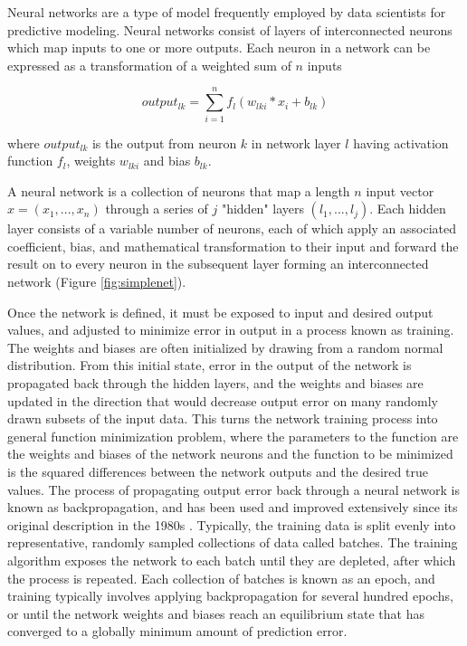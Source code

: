 Neural networks are a type of model frequently employed by data scientists
for predictive modeling. Neural networks consist of layers of interconnected neurons
which map inputs to one or more outputs. Each neuron in a network can be expressed as a 
transformation of a weighted sum of $n$ inputs 

\begin{equation}
output_{lk} = \sum_{i=1}^{n} f_l(w_{lki} * x_{i} + b_{lk})
\label{eq:neuron}
\end{equation}

where $output_{lk}$ is the output from neuron $k$ in network layer $l$ having activation
function $f_l$, weights $w_{lki}$ and bias $b_{lk}$.

A neural network is a collection of neurons that map a 
length $n$ input vector $x = (x_1, ..., x_n)$ through a series of $j$ 
"hidden" layers $(l_1, ..., l_j)$. Each hidden layer consists of a variable 
number of neurons, each of which apply an associated coefficient, bias, and 
mathematical transformation to their input and forward the 
result on to every neuron in the subsequent layer forming an interconnected 
network (Figure \ref{fig:simplenet}).

\ifdefined\showtablesandfigures
\fi

Once the network is defined, it must be exposed to input and desired output
values, and adjusted to minimize error in output in a process known as training.
The weights and biases are often initialized by drawing from a
random normal distribution. From this initial state, error in 
the output of the network is propagated back through the hidden 
layers, and the weights and biases are updated in the direction that would 
decrease output error on many randomly drawn subsets of the input data. 
This turns the network training process into general 
function minimization problem, where the parameters to the function are the 
weights and biases of the network neurons and the function to be 
minimized is the squared differences between the network outputs and 
the desired true values. The process of propagating output error back 
through a neural network is known as backpropagation, and has been used 
and improved extensively since its original description in the 
1980s \citep{rumelhart1986}.  Typically, the training data is split 
evenly into representative, randomly sampled collections of data 
called batches. The training algorithm exposes the network to each 
batch until they are depleted, after which the process is repeated. Each 
collection of batches is known as an epoch, and training typically 
involves applying backpropagation for several hundred epochs, or until the network
weights and biases reach an equilibrium state that has converged to a 
globally minimum amount of prediction error.

